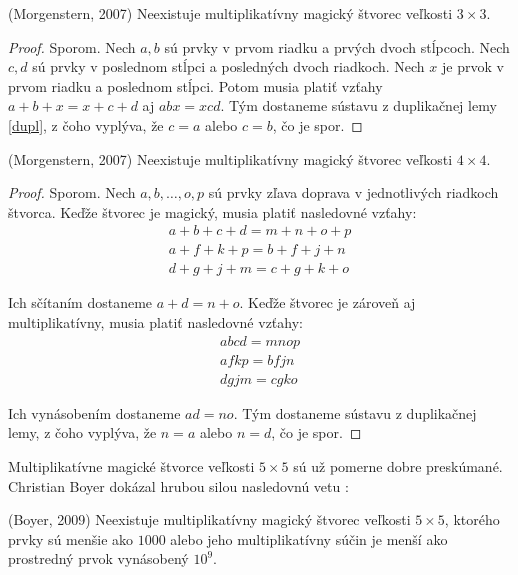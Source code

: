 \begin{theorem} (Morgenstern, 2007) Neexistuje multiplikatívny magický štvorec veľkosti $3 \times 3$.
\end{theorem}

\begin{proof} Sporom. Nech $a,b$ sú prvky v prvom riadku a prvých dvoch stĺpcoch. Nech $c,d$ sú prvky v poslednom stĺpci a posledných dvoch riadkoch. Nech $x$ je prvok v prvom riadku a poslednom stĺpci. Potom musia platiť vzťahy $a + b + x = x + c + d$ aj $abx = xcd$. Tým dostaneme sústavu z duplikačnej lemy \ref{dupl}, z čoho vyplýva, že $c = a$ alebo $c = b$, čo je spor.
\end{proof}

\begin{theorem} (Morgenstern, 2007) Neexistuje multiplikatívny magický štvorec veľkosti $4 \times 4$.
\end{theorem} 

\begin{proof} Sporom. Nech $a, b, \dots , o, p$ sú prvky zľava doprava v jednotlivých riadkoch štvorca. Keďže štvorec je magický, musia platiť nasledovné vzťahy:
\begin{gather*}
a + b + c + d = m + n + o + p \\
a + f + k + p = b + f + j + n \\
d + g + j + m = c + g + k + o
\end{gather*}

Ich sčítaním dostaneme $a + d = n + o$. Keďže štvorec je zároveň aj multiplikatívny, musia platiť nasledovné vzťahy:
\begin{gather*}
abcd = mnop \\
afkp = bfjn \\
dgjm = cgko
\end{gather*}

Ich vynásobením dostaneme $ad = no$. Tým dostaneme sústavu z duplikačnej lemy, z čoho vyplýva, že $n = a$ alebo $n = d$, čo je spor.
\end{proof}

Multiplikatívne magické štvorce veľkosti $5 \times 5$ sú už pomerne dobre preskúmané. Christian Boyer dokázal hrubou silou nasledovnú vetu \cite{multimagie}:

\begin{theorem} (Boyer, 2009) Neexistuje multiplikatívny magický štvorec veľkosti $5 \times 5$, ktorého prvky sú menšie ako $1000$ alebo jeho multiplikatívny súčin je menší ako prostredný prvok vynásobený $10^9$.
\end{theorem}

